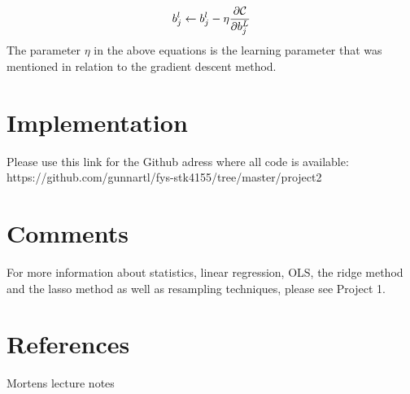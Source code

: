 \documentclass[a4paper,12pt]{article}
\begin{document}
\begin{equation}
    b_j^l \leftarrow b_j^l-\eta \frac{\partial {\cal C}}{\partial b_j^L}
\end{equation}
The parameter $\eta$ in the above equations is the learning parameter that was mentioned in relation to the gradient descent method.

\section{Implementation}
Please use this link for the Github adress where all code is available:\newline
https://github.com/gunnartl/fys-stk4155/tree/master/project2

\section{Comments}
For more information about statistics, linear regression, OLS, the ridge method and the lasso method as well as resampling techniques, please see Project 1.

\section{References}
Mortens lecture notes
\end{document}
